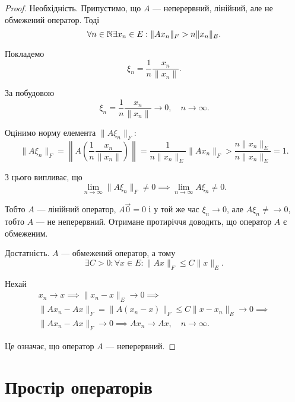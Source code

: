 \begin{proof}
Необхідність. Припустимо, що $A$ ---
неперервний, лінійний, але не обмежений оператор. Тоді
\begin{equation*}
    \forall n \in \mathbb{N} \exists x_n \in E: \|Ax_n\|_F > n \|x_n\|_E.
\end{equation*}

Покладемо
\begin{equation*}
    \xi_n = \frac{1}{n} \frac{x_n}{\|x_n\|}.
\end{equation*}

За побудовою
\begin{equation*}
    \xi_n = \frac{1}{n} \frac{x_n}{\|x_n\|} \to 0, \quad n \to \infty.
\end{equation*}

Оцінимо норму елемента $\|A \xi_n\|_F$:
\begin{equation*}
    \|A \xi_n\|_F = \left\| A \left( \frac{1}{n} \frac{x_n}{\|x_n\|} \right) \right\| =
    \frac{1}{n \|x_n\|_E} \|A x_n\|_F > \frac{n \|x_n\|_E}{n \|x_n\|_E} = 1.
\end{equation*}

З цього випливає, що
\begin{equation*}
    \lim_{n \to \infty} \|A \xi_n\|_F \ne 0 \implies
    \lim_{n \to \infty} A \xi_n \ne 0.
\end{equation*}

Тобто $A$ --- лінійний оператор, $A \vec 0 = 0$ і у той же час
$\xi_n \to 0$, але $A \xi_n \ne\to 0$, тобто $A$ --- не неперервний.
Отримане протиріччя доводить, що оператор $A$ є обмеженим.

Достатність. $A$ --- обмежений оператор, а тому
\begin{equation*}
    \exists C > 0: \forall x \in E: \|A x\|_F \le C \|x\|_E.
\end{equation*}

Нехай
\begin{multline*}
    x_n \to x \implies \|x_n - x\|_E \to 0 \implies \\
    \|Ax_n - Ax\|_F = \|A (x_n - x)\|_F \le C \|x - x_n\|_E \to 0 \implies \\
    \|A x_n - A x\|_F \to 0 \implies A x_n \to A x, \quad n \to \infty.
\end{multline*}

Це означає, що оператор $A$ --- неперервний. 
\end{proof}

\section{Простір операторів}

